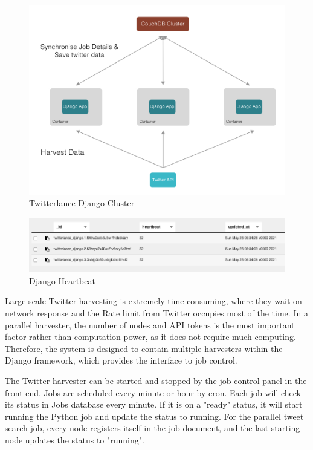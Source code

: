 \begin{figure}
\centerline{\includegraphics[width=6in]{Figures/Django.jpg}}
\caption{Twitterlance Django Cluster \label{Twitterlance Django Cluster}}
\end{figure}
\begin{figure}
\centerline{\includegraphics[width=6in]{Figures/heartbeat.png}}
\caption{Django Heartbeat \label{Django Node Heartbeat}}
\end{figure}

Large-scale Twitter harvesting is extremely time-consuming, where they wait on network response and the Rate limit from Twitter occupies most of the time. In a parallel harvester, the number of nodes and API tokens is the most important factor rather than computation power, as it does not require much computing. Therefore, the system is designed to contain multiple harvesters within the Django framework, which provides the interface to job control. 

The Twitter harvester can be started and stopped by the job control panel in the front end. Jobs are scheduled every minute or hour by cron. Each job will check its status in Jobs database every minute. If it is on a "ready" status, it will start running the Python job and update the status to running. For the parallel tweet search job, every node registers itself in the job document, and the last starting node updates the status to "running". 

